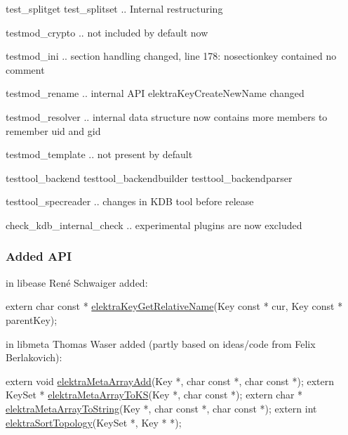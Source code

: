 \begin{DoxyItemize}
\item test\+\_\+splitget test\+\_\+splitset .. Internal restructuring
\item testmod\+\_\+crypto .. not included by default now
\item testmod\+\_\+ini .. section handling changed, line 178\+: {\ttfamily nosectionkey contained no comment}
\item testmod\+\_\+rename .. internal A\+PI elektra\+Key\+Create\+New\+Name changed
\item testmod\+\_\+resolver .. internal data structure now contains more members to remember uid and gid
\item testmod\+\_\+template .. not present by default
\item testtool\+\_\+backend testtool\+\_\+backendbuilder testtool\+\_\+backendparser
\item testtool\+\_\+specreader .. changes in K\+DB tool before release
\item check\+\_\+kdb\+\_\+internal\+\_\+check .. experimental plugins are now excluded
\end{DoxyItemize}

\subsubsection*{Added A\+PI}

in libease René Schwaiger added\+:


\begin{DoxyCode}
\textcolor{keyword}{extern} \textcolor{keywordtype}{char} \textcolor{keyword}{const} * \hyperlink{ease_2keyname_8c_a7a8eff2d0ef19a64a9beeedfcfe1df22}{elektraKeyGetRelativeName}(Key \textcolor{keyword}{const} * cur, Key \textcolor{keyword}{const} * 
      parentKey);
\end{DoxyCode}


in libmeta Thomas Waser added (partly based on ideas/code from Felix Berlakovich)\+:


\begin{DoxyCode}
\textcolor{keyword}{extern} \textcolor{keywordtype}{void} \hyperlink{group__meta_ga166c65c4eb2d758ced57b0bd74fb9a57}{elektraMetaArrayAdd}(Key *, \textcolor{keywordtype}{char} \textcolor{keyword}{const} *, \textcolor{keywordtype}{char} \textcolor{keyword}{const} *);
\textcolor{keyword}{extern} KeySet * \hyperlink{group__meta_ga57e189e739d942d60bb83765ced5cef2}{elektraMetaArrayToKS}(Key *, \textcolor{keywordtype}{char} \textcolor{keyword}{const} *);
\textcolor{keyword}{extern} \textcolor{keywordtype}{char} * \hyperlink{group__meta_ga40469799e2c6e9937eaf013bfc05d014}{elektraMetaArrayToString}(Key *, \textcolor{keywordtype}{char} \textcolor{keyword}{const} *, \textcolor{keywordtype}{char} \textcolor{keyword}{const} *);
\textcolor{keyword}{extern} \textcolor{keywordtype}{int} \hyperlink{group__meta_gaadfae80314be2415a7654fe8a0d2ee82}{elektraSortTopology}(KeySet *, Key * *);
\end{DoxyCode}


